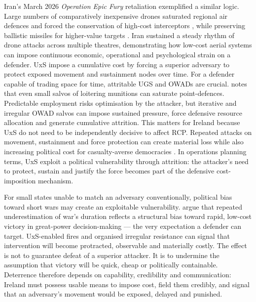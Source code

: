 Iran's March 2026 \textit{Operation Epic Fury} retaliation exemplified a similar logic. Large numbers of comparatively inexpensive drones saturated regional air defences and forced the conservation of high-cost interceptors \parencite[4--5]{hinote_ryan_2024}, while preserving ballistic missiles for higher-value targets \parencite{bondar_2026_03_10_iran_drone_campaign_gulf}. Iran sustained a steady rhythm of drone attacks across multiple theatres, demonstrating how low-cost aerial systems can impose continuous economic, operational and psychological strain on a defender. UxS impose a cumulative cost by forcing a superior adversary to protect exposed movement and sustainment nodes over time. For a defender capable of trading space for time, attritable UGS and OWADs are crucial. 
\textcite[138--139]{Watling_book} notes that even small salvos of loitering munitions can saturate point-defences. Predictable employment risks optimisation by the attacker, but iterative and irregular OWAD salvos can impose sustained pressure, force defensive resource allocation and generate cumulative attrition. This matters for Ireland because UxS do not need to be independently decisive to affect RCP. Repeated attacks on movement, sustainment and force protection can create material loss while also increasing political cost for casualty-averse democracies \parencite{luttwak_1996_post_heroic}. In operations planning terms, UxS exploit a political vulnerability through attrition: the attacker’s need to protect, sustain and justify the force becomes part of the defensive cost-imposition mechanism.



For small states unable to match an adversary conventionally, political bias toward short wars may create an exploitable vulnerability. \textcite{RAND_short_War} argue that repeated underestimation of war's duration reflects a structural bias toward rapid, low-cost victory in great-power decision-making --- the very expectation a defender can target. UxS-enabled fires and organised irregular resistance can signal that intervention will become protracted, observable and materially costly. The effect is not to guarantee defeat of a superior attacker. It is to undermine the assumption that victory will be quick, cheap or politically containable. Deterrence therefore depends on capability, credibility and communication: Ireland must possess usable means to impose cost, field them credibly, and signal that an adversary's movement would be exposed, delayed and punished.

